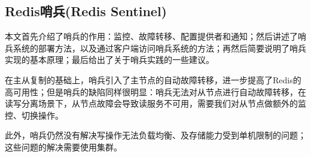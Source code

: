 \documentclass[../../../interview-questions.tex]{subfiles}
\begin{document}
\subsection{Redis哨兵(Redis Sentinel)}

本文首先介绍了哨兵的作用：监控、故障转移、配置提供者和通知；然后讲述了哨兵系统的部署方法，以及通过客户端访问哨兵系统的方法；再然后简要说明了哨兵实现的基本原理；最后给出了关于哨兵实践的一些建议。

在主从复制的基础上，哨兵引入了主节点的自动故障转移，进一步提高了Redis的高可用性；但是哨兵的缺陷同样很明显：哨兵无法对从节点进行自动故障转移，在读写分离场景下，从节点故障会导致读服务不可用，需要我们对从节点做额外的监控、切换操作。

此外，哨兵仍然没有解决写操作无法负载均衡、及存储能力受到单机限制的问题；这些问题的解决需要使用集群。
\end{document}
